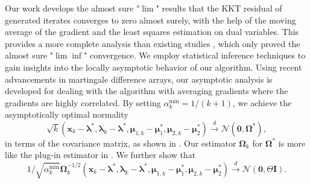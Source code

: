 \documentclass[aos]{imsart}
\numberwithin{equation}{section}
\theoremstyle{plain}
\begin{document}
Our work develops the almost sure "$\lim$" results that the KKT residual of generated iterates converges to zero almost surely, with the help of the moving average of the gradient and the least squares estimation on dual variables. 
This provides a more complete analysis than existing studies \cite{curtis2023sequential}, which only proved the almost sure "$\lim \inf$" convergence.
We employ statistical inference techniques to gain insights into the locally asymptotic behavior of our algorithm. 
Using recent advancements in martingale difference arrays, our asymptotic analysis is developed for dealing with the algorithm with averaging gradients where the gradients are highly correlated. 
By setting $\alpha_k^{\text{min}} = 1 / (k+1)$, we achieve the asymptotically optimal normality 
$$\sqrt{k}  (\bm{x}_k - \bm{\lambda}^{*}, \bm{\lambda}_{k} - \bm{\lambda}^{*}, \bm{\mu}_{1,k} - \bm{\mu}_1^{*}, \bm{\mu}_{2,k} - \bm{\mu}_2^{*}) \stackrel{d}{\longrightarrow} \mathcal{N} \left( \bm{0}, \bm{\Omega}^{*} \right) ,$$ 
in terms of the covariance matrix, as shown in \cite{duchi2021asymptotic}. 
Our estimator  $\bm{\Omega}_k$ for $\bm{\Omega}^{*}$ is more like the plug-in estimator in \cite{chen2020statistical}. 
We further show that 
$$ 1/\sqrt{\alpha_k^{\text{min}}} \bm{\Omega}_k^{-1/2}(\bm{x}_k - \bm{\lambda}^{*}, \bm{\lambda}_{k} - \bm{\lambda}^{*}, \bm{\mu}_{1,k} - \bm{\mu}_1^{*}, \bm{\mu}_{2,k} - \bm{\mu}_2^{*}) \stackrel{d}{\longrightarrow} \mathcal{N} \left( \bm{0}, \Theta \bm{I} \right) .$$ 
\end{document}
